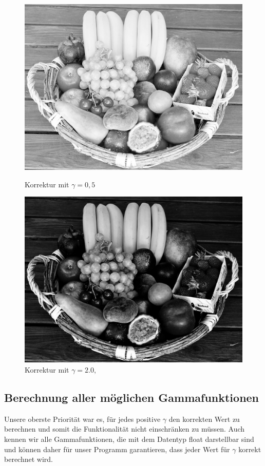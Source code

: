 \documentclass[course=erap]{aspdoc}
\begin{document}
\begin{figure}[h]
\begin{minipage}{0.49\linewidth}
			\includegraphics[scale=1.2]{Images/fruit_basket_gamma_0,5.png}
			\caption{Korrektur mit $\gamma = 0,5$}
			\label{ObstkorbGamma0_5}
		\end{minipage}
		\centering
		\begin{minipage}{0.49\linewidth}
			\centering
			\includegraphics[scale=1.2]{Images/fruit_basket_gamma_2.png}
			\caption{Korrektur mit $\gamma = 2.0,$}
			\label{ObstkorbGamma2}
		\end{minipage}
	\end{figure}
	
	\subsection{Berechnung aller möglichen Gammafunktionen}
	Unsere oberste Priorität war es, für jedes positive $\gamma$ den korrekten Wert zu berechnen und somit die Funktionalität nicht  einschränken zu müssen. Auch kennen wir alle Gammafunktionen, die mit dem Datentyp float darstellbar sind und können daher für unser Programm garantieren, dass jeder Wert für $\gamma$ korrekt berechnet wird. 
	
\end{document}
